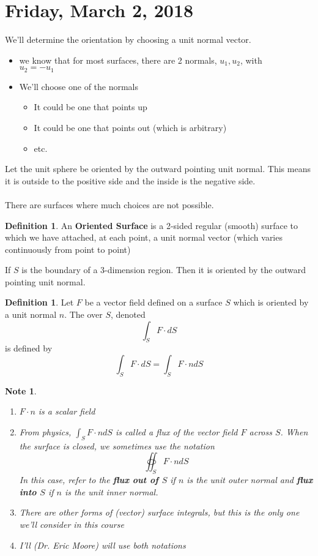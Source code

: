 \documentclass[12pt]{article}
\theoremstyle{plain}
\newtheorem*{note}{Note}
\theoremstyle{definition}
\newtheorem{definition}[theorem]{Definition}
\begin{document}
\section{Friday, March 2, 2018}

We'll determine the orientation by choosing a unit normal vector.
\begin{itemize}
	\item{we know that for most surfaces, there are 2 normals, $u_1, u_2$, with\\ $u_2 = -u_1$}
	\item{We'll choose one of the normals}
	\begin{itemize}
		\item{It could be one that points up}
		\item{It could be one that points out (which is arbitrary)}
		\item{etc.}
	\end{itemize}
\end{itemize}

Let the unit sphere be oriented by the outward pointing unit normal. This means it is outside to the positive side and the inside is the negative side.\\
\\
There are surfaces where much choices are not possible.

\begin{definition}
	An \textbf{Oriented Surface} is a 2-sided regular (smooth) surface to which we have attached, at each point, a unit normal vector (which varies continuously from point to point)
\end{definition}

If $S$ is the boundary of a 3-dimension region. Then it is oriented by the outward pointing unit normal.

\begin{definition}
	Let $F$ be a vector field defined on a surface $S$ which is oriented by a unit normal $n$. The \textunderscore over $S$, denoted
	$$\int_S F \cdot dS$$
	is defined by
	$$\int_S F \cdot dS = \int_S F \cdot n dS$$
\end{definition}

\begin{note}
	\begin{enumerate}
		\item{$F \cdot n$ is a scalar field}
		\item{From physics, $\int_S F \cdot n dS$ is called a flux of the vector field $F$ across $S$. When the surface is closed, we sometimes use the notation
		$$\oiint_S F \cdot n dS $$
		In this case, refer to the \textbf{flux out of $S$} if $n$ is the unit outer normal and \textbf{flux into $S$} if $n$ is the unit inner normal.
		}
		\item{There are other forms of (vector) surface integrals, but this is the only one we'll consider in this course}
		\item{I'll (Dr. Eric Moore) will use both notations}
	\end{enumerate}
\end{note}
\end{document}
